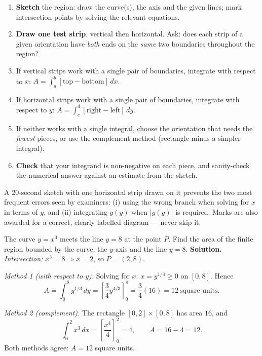\documentclass[11pt]{article}
\begin{document}
\begin{methode}
\begin{enumerate}
\item \textbf{Sketch} the region: draw the curve(s), the axis and the given lines; mark intersection points by solving the relevant equations.
\item \textbf{Draw one test strip}, vertical then horizontal. Ask: does each strip of a given orientation have \emph{both} ends on the \emph{same} two boundaries throughout the region?
\item If vertical strips work with a single pair of boundaries, integrate with respect to $x$: $A=\displaystyle\int_a^b[\text{top}-\text{bottom}]\,dx$.
\item If horizontal strips work with a single pair of boundaries, integrate with respect to $y$: $A=\displaystyle\int_c^d[\text{right}-\text{left}]\,dy$.
\item If neither works with a single integral, choose the orientation that needs the \emph{fewest} pieces, or use the complement method (rectangle minus a simpler integral).
\item \textbf{Check} that your integrand is non-negative on each piece, and sanity-check the numerical answer against an estimate from the sketch.
\end{enumerate}
\end{methode}

\begin{attention}
A 20-second sketch with one horizontal strip drawn on it prevents the two most frequent errors seen by examiners: (i) using the wrong branch when solving for $x$ in terms of $y$, and (ii) integrating $g(y)$ when $|g(y)|$ is required. Marks are also awarded for a correct, clearly labelled diagram — never skip it.
\end{attention}

\begin{exoresolu}
The curve $y=x^3$ meets the line $y=8$ at the point $P$. Find the area of the finite region bounded by the curve, the $y$-axis and the line $y=8$.
\tcblower
\textbf{Solution.} \emph{Intersection:} $x^3=8\Rightarrow x=2$, so $P=(2,8)$.

\emph{Method 1 (with respect to $y$).} Solving for $x$: $x=y^{1/3}\geq 0$ on $[0,8]$. Hence
\[
A=\int_0^8 y^{1/3}\,dy=\left[\frac{3}{4}y^{4/3}\right]_0^8=\frac{3}{4}(16)=12\ \text{square units}.
\]

\emph{Method 2 (complement).} The rectangle $[0,2]\times[0,8]$ has area $16$, and
\[
\int_0^2 x^3\,dx=\left[\frac{x^4}{4}\right]_0^2=4,\qquad A=16-4=12.
\]
Both methods agree: $A=12$ square units.
\end{exoresolu}
\end{document}
